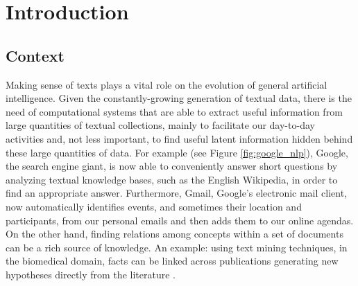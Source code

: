 \chapter{Introduction}
\label{chap:intro}
\minitoc
\section{Context}

Making sense of texts plays a vital role on the evolution of general artificial intelligence. Given the constantly-growing generation of textual data, there is the need of computational systems that are able to extract useful information from large quantities of textual collections, mainly to facilitate our day-to-day activities and, not less important, to find useful latent information hidden behind these large quantities of data. For example (see Figure \ref{fig:google_nlp}), Google, the search engine giant, is now able to conveniently answer short questions by analyzing textual knowledge bases, such as the English Wikipedia, in order to find an appropriate answer. Furthermore, Gmail, Google's electronic mail client, now  automatically identifies events, and sometimes their location and participants, from our personal emails and then adds  them to our online agendas. On the other hand, finding relations among concepts within a set of documents can be a rich source of knowledge. An example: using text mining techniques, in the biomedical domain,  facts can be linked across publications generating new hypotheses directly from the literature \cite{garten2010recent}. 

